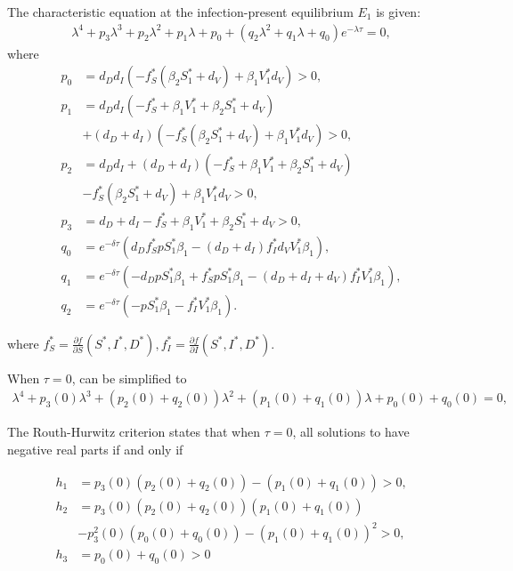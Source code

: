 \documentclass{CMHPhD-SIVD}
\begin{document}
The characteristic equation at the infection-present equilibrium $E_1$ is given:
\begin{equation}\label{9}
   \begin{array}{ll}
    \lambda^4+p_3 \lambda^3+p_2 \lambda^2+p_1 \lambda+p_0+(q_2 \lambda^2+q_1 \lambda+q_0)e^{-\lambda \tau}=0,
   \end{array}
\end{equation}
where
\begin{align*}
p_0&=d_D d_I\left(-f_S^*(\beta_2 S_1^*+d_{V})+ \beta_1 V_1^*d_V\right)>0,\\
p_1&=d_D d_I \left(-f_S^* + \beta_1 V_1^*+\beta_2 S_1^*+d_{V}\right) \nonumber \\
& + (d_D + d_I) \left(-f_S^*(\beta_2 S_1^*+d_{V})+ \beta_1 V_1^*d_V\right)>0, \\
p_2&=d_D d_I + (d_D+ d_I) \left(-f_S^*+ \beta_1 V_1^*+\beta_2 S_1^*+d_{V}\right)\nonumber \\
&-f_S^*(\beta_2 S_1^*+d_{V}) + \beta_1 V_1^* d_V>0, \\
p_3&=d_D + d_I -f_S^*+ \beta_1 V_1^* + \beta_2 S_1^*+d_{V}>0, \\
q_0&=e^{-\delta\tau}\left(d_D f_S^* p S_1^* \beta_1 - (d_D+ d_I)f_I^* d_V V_1^* \beta_1\right),\\
q_1&=e^{-\delta\tau}\left(-d_D p S_1^* \beta_1+f_S^* p S_1^* \beta_1 - (d_D+
d_I+d_V) f_I^* V_1^* \beta_1\right),\\
q_2&=e^{-\delta\tau}\left(-p S_1^* \beta_1-f_I^* V_1^* \beta_1\right).
\end{align*}

where $f_S^*=\frac{\partial f}{\partial S}(S^*, I^*, D^*), f_I^*=\frac{\partial f}{\partial I}(S^*, I^*, D^*).$




When $\tau=0$,  can be simplified to
\begin{equation}\label{10}
   \begin{array}{ll}
    \lambda^4+p_3(0) \lambda^3+(p_2(0) + q_2(0)) \lambda^2+(p_1(0) + q_1(0)) \lambda+p_0(0) +q_0(0)=0,
   \end{array}
\end{equation}

The Routh-Hurwitz criterion states that when $\tau=0$, all solutions to  have negative real parts if and only if

\begin{equation}\label{11}
\begin{aligned}
h_{1}&=p_3(0)(p_2(0) + q_2(0))-(p_1(0) + q_1(0))>0,\\
h_{2}&=p_3(0)(p_2(0) + q_2(0))(p_1(0) + q_1(0))\nonumber \\
&-p_3^2(0)(p_0(0) +q_0(0))-(p_1(0) + q_1(0))^2>0,\\
h_{3}&=p_0(0) +q_0(0)>0
\end{aligned}
\end{equation}
\end{document}
